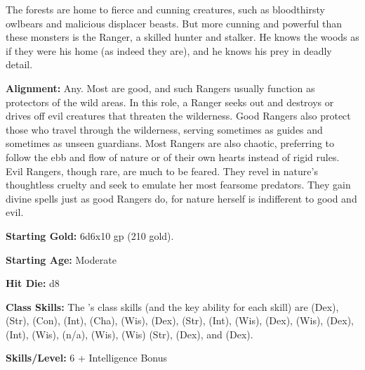 
The forests are home to fierce and cunning creatures, such as bloodthirsty owlbears and malicious displacer beasts. But more cunning and powerful than these monsters is the Ranger, a skilled hunter and stalker. He knows the woods as if they were his home (as indeed they are), and he knows his prey in deadly detail.

\textbf{Alignment:} Any. Most are good, and such Rangers usually function as protectors of the wild areas. In this role, a Ranger seeks out and destroys or drives off evil creatures that threaten the wilderness. Good Rangers also protect those who travel through the wilderness, serving sometimes as guides and sometimes as unseen guardians. Most Rangers are also chaotic, preferring to follow the ebb and flow of nature or of their own hearts instead of rigid rules. Evil Rangers, though rare, are much to be feared. They revel in nature’s thoughtless cruelty and seek to emulate her most fearsome predators. They gain divine spells just as good Rangers do, for nature herself is indifferent to good and evil.

\textbf{Starting Gold:} 6d6x10 gp (210 gold).

\textbf{Starting Age:} Moderate

\textbf{Hit Die:} d8

\textbf{Class Skills:} The \currentclassname{}'s class skills (and the key ability for each skill) are  (Dex),  (Str),  (Con),  (Int),  (Cha),  (Wis),  (Dex),  (Str),  (Int),  (Wis),  (Dex),  (Wis),  (Dex),  (Int),  (Wis),  (n/a),  (Wis),  (Wis)  (Str),  (Dex), and  (Dex).

\textbf{Skills/Level:} 6 + Intelligence Bonus

\goodbab{}
\poorfor{}
\goodref{}
\poorwil{}

